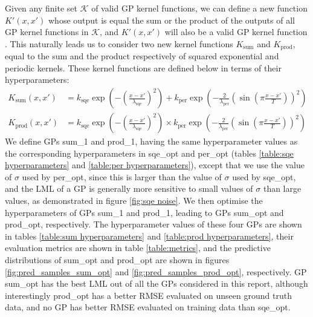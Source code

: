 Given any finite set $\mathcal{K}$ of valid GP kernel functions, we can define a new function $K'(x, x')$ whose output is equal the sum or the product of the outputs of all GP kernel functions in $\mathcal{K}$, and $K'(x, x')$ will also be a valid GP kernel function \cite{bishop2006pattern}. This naturally leads us to consider two new kernel functions $K_\text{sum}$ and $K_\text{prod}$, equal to the sum and the product respectively of squared exponential and periodic kernels. These kernel functions are defined below in terms of their hyperparameters:
\begin{align}
    K_\text{sum}(x, x') &= k_{\text{sqe}} \exp\left( -\left( \frac{x - x'}{\lambda_{\text{sqe}}} \right)^2 \right) + k_{\text{per}} \exp\left( -\frac{2}{\lambda_{\text{per}}} \left( \sin \left( \pi \frac{x-x'}{T} \right) \right)^2 \right) \\
    K_\text{prod}(x, x') &= k_{\text{sqe}} \exp\left( -\left( \frac{x - x'}{\lambda_{\text{sqe}}} \right)^2 \right) \times k_{\text{per}} \exp\left( -\frac{2}{\lambda_{\text{per}}} \left( \sin \left( \pi \frac{x-x'}{T} \right) \right)^2 \right)
\end{align}
We define GPs sum\_1 and prod\_1, having the same hyperparameter values as the corresponding hyperparameters in sqe\_opt and per\_opt (tables \ref{table:sqe hyperparameters} and \ref{table:per hyperparameters}), except that we use the value of $\sigma$ used by per\_opt, since this is larger than the value of $\sigma$ used by sqe\_opt, and the LML of a GP is generally more sensitive to small values of $\sigma$ than large values, as demonstrated in figure \ref{fig:sqe noise}. We then optimise the hyperparameters of GPs sum\_1 and prod\_1, leading to GPs sum\_opt and prod\_opt, respectively. The hyperparameter values of these four GPs are shown in tables \ref{table:sum hyperparameters} and \ref{table:prod hyperparameters}, their evaluation metrics are shown in table \ref{table:metrics}, and the predictive distributions of sum\_opt and prod\_opt are shown in figures \ref{fig:pred_samples_sum_opt} and \ref{fig:pred_samples_prod_opt}, respectively. GP sum\_opt has the best LML out of all the GPs considered in this report, although interestingly prod\_opt has a better RMSE evaluated on unseen ground truth data, and no GP has better RMSE evaluated on training data than sqe\_opt.
